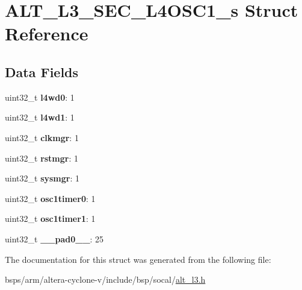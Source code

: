 \hypertarget{structALT__L3__SEC__L4OSC1__s}{}\section{A\+L\+T\+\_\+\+L3\+\_\+\+S\+E\+C\+\_\+\+L4\+O\+S\+C1\+\_\+s Struct Reference}
\label{structALT__L3__SEC__L4OSC1__s}
\subsection*{Data Fields}
\begin{DoxyCompactItemize}
\item 
\mbox{\label{structALT__L3__SEC__L4OSC1__s_a6147becd3e7cb0ddef48cca91443f091}} 
uint32\+\_\+t {\bfseries l4wd0}\+: 1
\item 
\mbox{\label{structALT__L3__SEC__L4OSC1__s_a56441b784cb637cf6847de75192be1c3}} 
uint32\+\_\+t {\bfseries l4wd1}\+: 1
\item 
\mbox{\label{structALT__L3__SEC__L4OSC1__s_a1ea20b881e0b9b9e28dc75b1b849dc82}} 
uint32\+\_\+t {\bfseries clkmgr}\+: 1
\item 
\mbox{\label{structALT__L3__SEC__L4OSC1__s_a9c137c514a5d61fae475635b7e703dd1}} 
uint32\+\_\+t {\bfseries rstmgr}\+: 1
\item 
\mbox{\label{structALT__L3__SEC__L4OSC1__s_afeaf75e305fcfe8a18cf69c2ea658c97}} 
uint32\+\_\+t {\bfseries sysmgr}\+: 1
\item 
\mbox{\label{structALT__L3__SEC__L4OSC1__s_af0537b45b4544d705b57c6eec28eb122}} 
uint32\+\_\+t {\bfseries osc1timer0}\+: 1
\item 
\mbox{\label{structALT__L3__SEC__L4OSC1__s_a4707c752b60188df96e7e25d29b76f4a}} 
uint32\+\_\+t {\bfseries osc1timer1}\+: 1
\item 
\mbox{\label{structALT__L3__SEC__L4OSC1__s_a1d8c602391f5cefc941ccfdc35b02b84}} 
uint32\+\_\+t {\bfseries \+\_\+\+\_\+pad0\+\_\+\+\_\+}\+: 25
\end{DoxyCompactItemize}


The documentation for this struct was generated from the following file\+:\begin{DoxyCompactItemize}
\item 
bsps/arm/altera-\/cyclone-\/v/include/bsp/socal/\mbox{\hyperlink{alt__l3_8h}{alt\+\_\+l3.\+h}}\end{DoxyCompactItemize}
